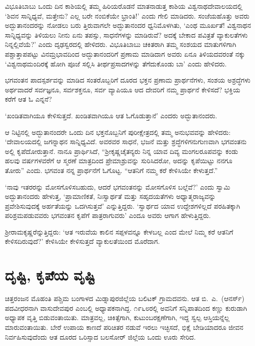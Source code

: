 ವಿಭೂತಿಬಾಬು ಒಂದು ದಿನ ಕಾಶಿಯಲ್ಲಿ ತಮ್ಮ ಹಿರಿಯರೊಡನೆ ಮಾತನಾಡುತ್ತ ಕಾಶಿಯ ವಿಶ್ವನಾಥದೇವಾಲಯದಲ್ಲಿ ‘ಶಿವನ ಸಾನ್ನಿಧ್ಯವೆ, ಮತ್ತೇನು? ಎಲ್ಲ ಬರೇ ನಂಬಿಕೆಯೇ ಭ್ರಾಂತಿ!’ ಎಂದು ಗೇಲಿ ಮಾಡಿದರು. ಸಂಜೆಯಹೊತ್ತು ಅವರು ಅದ್ಭುತಾನಂದರನ್ನು ನೋಡಲು ಬರು ತ್ತಿರುವಾಗಲೇ ಅದ್ಭುತಾನಂದರ ಧ್ವನಿಮೊಳಗಿತು, ‘ಎಂಥ ಮೂರ್ಖತೆ! ವಿಶ್ವನಾಥನ ಸಾನ್ನಿಧ್ಯವನ್ನು ತಿಳಿಯಲು ನೀನು ಏನು ತಪಸ್ಸು, ಸಾಧನೆಗಳನ್ನು ಮಾಡಿರುವೆ? ಅದಕ್ಕೆ ಬೇಕಾದ ಪವಿತ್ರತೆ ವ್ಯಾಕುಲತೆಗಳು ನಿನ್ನಲ್ಲಿವೆಯೆ?’ ಎಂದು ದೃಢಸ್ವರದಲ್ಲಿ ಹೇಳಿದರು. ವಿಭೂತಿಬಾಬು ಚಕಿತರಾಗಿ ತಮ್ಮ ಸಂಶಯದ ಮಾತುಗಳಿಗಾಗಿ ಪಶ್ಚಾತ್ತಾಪಪಟ್ಟು ವಿನಮ್ರಭಾವದಿಂದ ಅದ್ಭುತಾನಂದರಿಗೆ ಪ್ರಣಾಮ ಮಾಡಿದಾಗ ಅವರು ಏನೂ ತಿಳಿಯದವರಂತೆ ನಕ್ಕು ‘ವಿಶ್ವನಾಥಮಂದಿರಕ್ಕೆ ಹೋಗಿ ಪೂಜೆ ಸಲ್ಲಿಸಿ ತೀರ್ಥಪ್ರಸಾದಗಳನ್ನು ತೆಗೆದುಕೊಂಡು ಬಾ’ ಎಂದು ಹೇಳಿದರು.

ಭಗವಂತನ ಪಾದಸ್ಪರ್ಶವನ್ನು ಮಾಡಿದ ಸಂತರೊಬ್ಬರಿಗೆ ದೂರದ ಭಕ್ತನ ಪ್ರಣಾಮ ಪ್ರಾರ್ಥನೆಗಳು, ಸಂಶಯ ಅಶ್ರದ್ಧೆಗಳು ಅರ್ಥವಾದರೆ ಸರ್ವಜ್ಞನೂ, ಸರ್ವಶಕ್ತನೂ, ಸರ್ವ ವ್ಯಾಪಿಯೂ ಆದ ದೇವರಿಗೆ ನಮ್ಮ ಪ್ರಾರ್ಥನೆ ಕೇಳಿಸದೆ? ಭಕ್ತಿಯ ಕರೆಗೆ ಆತ ಓ ಎನ್ನನೆ?

‘ಖಂಡಿತವಾಗಿಯೂ ಕೇಳಿಸುತ್ತದೆ. ಖಂಡಿತವಾಗಿಯೂ ಆತ ಓಗೊಡುತ್ತಾನೆ’ ಎಂದರು ಅದ್ಭುತಾನಂದರು.

ಆ ನಿಟ್ಟಿನಲ್ಲಿ ಅದ್ಭುತಾನಂದರೇ ಒಂದು ದಿನ ಭಕ್ತನೊಬ್ಬನಿಗೆ ಪುರೀಕ್ಷೇತ್ರದಲ್ಲಿ ತಮ್ಮ ಅನುಭವವನ್ನು ಹೇಳಿದರು: ‘ದೇವಾಲಯದಲ್ಲಿ ಜಗನ್ನಾಥನ ಸಾನ್ನಿಧ್ಯವಿದೆ. ಅವರವರ ಸಾಧನೆ, ಭಜನೆ ಮತ್ತು ಶ್ರದ್ಧೆಗಳಿಗನುಗುಣವಾಗಿ ಭಗವಂತನು ಅಲ್ಲಿ ಕೃಪೆದೋರುತ್ತಾನೆ. ನಾನೂ ಪ್ರಾರ್ಥಿಸಿದೆ, “ಶ‍್ರೀಕೃಷ್ಣಚೈತನ್ಯರು ನಿನ್ನ ಯಾವ ದಿವ್ಯ ಮಂಗಲರೂಪವನ್ನು ಕಂಡು ಹಲವು ವರ್ಷಗಳವರೆಗೆ ಆ ಸ್ಮರಣೆ ಮಾತ್ರದಿಂದ ಪ್ರೇಮಾಶ್ರುವನ್ನು ಸುರಿಸಿದರೋ, ಅದನ್ನು ಕೃಪೆಯಿಟ್ಟು ನನಗೂ ತೋರು” ಎಂದು. ಭಗವಂತ ನನ್ನ ಪ್ರಾರ್ಥನೆಗೆ ಓಗೊಟ್ಟ. “ಆತನಿಗೆ ನಮ್ಮ ಕರೆ ಕೇಳಿಸಿಯೇ ಕೇಳುತ್ತದೆ.”

‘ನಾವು ಇತರರನ್ನು ಮೋಸಗೊಳಿಸಬಹುದು, ಆದರೆ ಭಗವಂತನನ್ನು ಮೋಸಗೊಳಿಸ ಬಲ್ಲೆವೆ?’ ಎಂದು ಸ್ವಾಮಿ ಅದ್ಭುತಾನಂದರು ಹೇಳುತ್ತ, ‘ಪ್ರಾಮಾಣಿಕತೆ, ನಿಃಸ್ವಾರ್ಥತೆ ಮತ್ತು ಸಹೃದಯತೆಗಳು ಅಧ್ಯಾತ್ಮರಾಜ್ಯವನ್ನು ಪ್ರವೇಶಿಸುವುದಕ್ಕೆ ಅರ್ಹತೆಯನ್ನು ಒದಗಿಸುತ್ತವೆ’ ಎನ್ನುತ್ತಿದ್ದರು. ‘ಸ್ವಾರ್ಥದ ಯಾವ ಉದ್ದೇಶಗಳಿಲ್ಲದೆ ಪರಹಿತಕ್ಕಾಗಿ ಪರಿಶ್ರಮಪಡುವವರು ಭಗವಂತನ ಕೃಪೆಗೆ ಪಾತ್ರರಾಗುವರು’ ಎಂದೂ ಅವರು ಆಗಾಗ ಹೇಳುತ್ತಿದ್ದರು.

ಶ‍್ರೀರಾಮಕೃಷ್ಣರೆನ್ನುತ್ತಿದ್ದರು: ‘ಆತ ಇರುವೆಯ ಕಾಲಿನ ಸಪ್ಪಳವನ್ನೂ ಕೇಳಬಲ್ಲ ಎಂದ ಮೇಲೆ ನಿಮ್ಮ ಕರೆ ಆತನಿಗೆ ಕೇಳಿಸದಿರುವುದೆ?’ ಕೇಳಿಸಿಯೇ ಕೇಳಿಸುತ್ತದೆ ವ್ಯಾಕುಲತೆಯಿಂದ ಮೊರೆದಾಗ.


\section*{ದೃಷ್ಟಿ, ಕೃಪೆಯ ವೃಷ್ಟಿ}


ಚಿತ್ತರಂಜನ ಮೊಹಂತಿ ಪಶ್ಚಿಮ ಬಂಗಾಳದ ಮಿಡ್ನಾಪುರಜಿಲ್ಲೆಯ ಬಲಿಟಕ್ ಗ್ರಾಮದವನು. ಆತ ಬಿ.\ ಎ.\ (ಆನರ್ಸ್​) ಪದವೀಧರನಾಗಿ ವಾಸುದೇವಪುರ ಎಂಬಲ್ಲಿ ಅಧ್ಯಾಪಕನಾಗಿದ್ದ. ೧೯೬೮ರಲ್ಲಿ ಅವನಿಗೆ ಸನ್ನಿಪಾತದಿಂದ ಕಣ್ಣು ಕುರುಡಾಗಿ ಅಧ್ಯಾಪಕ ವೃತ್ತಿ ಬಿಡುವಂತಾಯಿತು. ಮಾತ್ರವಲ್ಲ, ಚಿಕಿತ್ಸೆಗಾಗಿ, ಕುಟುಂಬರಕ್ಷಣೆಗಾಗಿ, ಇದ್ದ ಸ್ವಲ್ಪ ಆಸ್ತಿಯನ್ನೆಲ್ಲ ಮಾರುವಂತಾಯಿತು. ಬೇರೆ ಉಪಾಯ ಕಾಣದೆ ಪರಿಚಿತರ ನಡುವೆ ಇರಲು ಇಚ್ಛಿಸದೆ, ಭಿಕ್ಷೆ ಬೇಡಿಯಾದರೂ ಜೀವನ ನಿರ್ವಹಿಸುವುದೆಂದು ಆತ ದೂರದ ಒರಿಸ್ಸಾದ ಬಲಸೋರ್ ಜಿಲ್ಲೆಯ ಒಂದು ಊರು ಸೇರಿದ.

